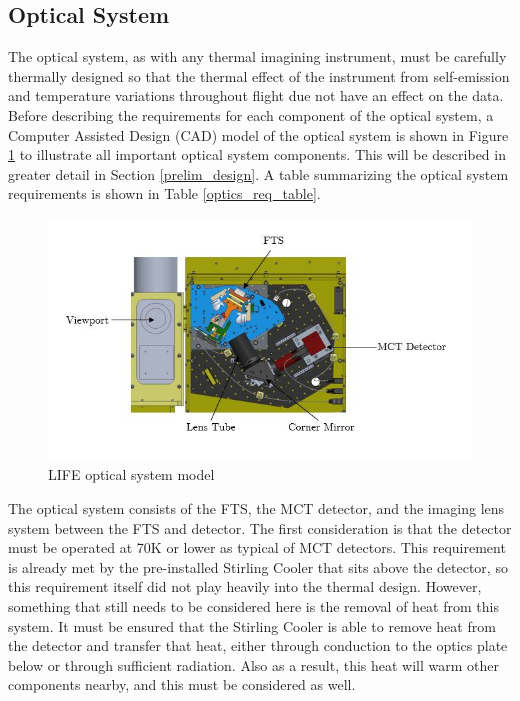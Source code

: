 \subsection{Optical System}
The optical system, as with any thermal imagining instrument, must be carefully thermally designed so that the thermal effect of the instrument from self-emission and temperature variations throughout flight due not have an effect on the data. Before describing the requirements for each component of the optical system, a Computer Assisted Design (CAD) model of the optical system is shown in Figure \ref{fig:optical_system_diagram} to illustrate all important optical system components. This will be described in greater detail in Section \ref{prelim_design}. A table summarizing the optical system requirements is shown in Table \ref{optics_req_table}.

\begin{figure}[h]
\centering
  \includegraphics[width=\linewidth]{chap3_images/optical_system_diagram.JPG}
  \caption{LIFE optical system model}
  \label{fig:optical_system_diagram}
\end{figure}

The optical system consists of the FTS, the MCT detector, and the imaging lens system between the FTS and detector. The first consideration is that the detector must be operated at 70K or lower as typical of MCT detectors. This requirement is already met by the pre-installed Stirling Cooler that sits above the detector, so this requirement itself did not play heavily into the thermal design. However, something that still needs to be considered here is the removal of heat from this system. It must be ensured that the Stirling Cooler is able to remove heat from the detector and transfer that heat, either through conduction to the optics plate below or through sufficient radiation. Also as a result, this heat will warm other components nearby, and this must be considered as well.

